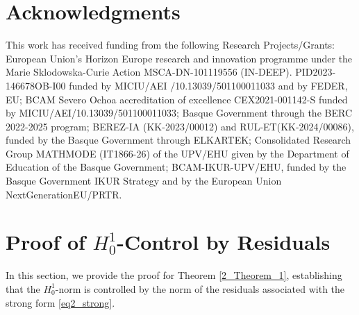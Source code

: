 \documentclass[oneside]{article}
\begin{document}

\section{Acknowledgments}\label{Acknowledgments}
This work has received funding from the following Research Projects/Grants: 
European Union’s Horizon Europe research and innovation programme under the Marie Sklodowska-Curie Action MSCA-DN-101119556 (IN-DEEP). 
PID2023-146678OB-I00 funded by MICIU/AEI /10.13039/501100011033 and by FEDER, EU;
BCAM Severo Ochoa accreditation of excellence CEX2021-001142-S funded by MICIU/AEI/10.13039/501100011033; 
Basque Government through the BERC 2022-2025 program;
BEREZ-IA (KK-2023/00012) and RUL-ET(KK-2024/00086), funded by the Basque Government through ELKARTEK;
Consolidated Research Group MATHMODE (IT1866-26) of the UPV/EHU given by the Department of Education of the Basque Government; 
BCAM-IKUR-UPV/EHU, funded by the Basque Government IKUR Strategy and by the European Union NextGenerationEU/PRTR. 


\makeatletter
\renewcommand{\@seccntformat}[1]{%
  \ifstrequal{#1}{section}{%
    \appendixname~\csname the#1\endcsname:\quad
  }{%
    \csname the#1\endcsname\quad
  }%
}
\makeatother

\appendix
\section{Proof of $H^1_0$-Control by Residuals}\label{Proof of H-Control by Residuals}

In this section, we provide the proof for Theorem \ref{2_Theorem_1}, establishing that the $H^1_0$-norm is controlled by the norm of the residuals associated with the strong form \eqref{eq2_strong}.
\end{document}

